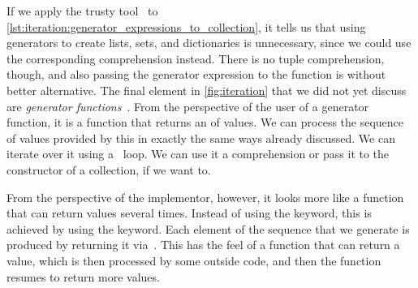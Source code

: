 If we apply the trusty tool \ruff\ to \cref{lst:iteration:generator_expressions_to_collection}, it tells us that using generators to create lists, sets, and dictionaries is unnecessary, since we could use the corresponding comprehension instead.
There is no tuple comprehension, though, and also passing the generator expression to the  function is without better alternative.%
%
%
%
\FloatBarrier%
\endhsection%
%
%
%
%
%
%
%
%
%
The final element in \cref{fig:iteration} that we did not yet discuss are \emph{generator functions}~\cite{PEP255}.
From the perspective of the user of a generator function, it is a function that returns an  of values.
We can process the sequence of values provided by this  in exactly the same ways already discussed.
We can iterate over it using a ~loop.
We can use it a comprehension or pass it to the constructor of a collection, if we want to.

From the perspective of the implementor, however, it looks more like a function that can return values several times.
Instead of using the  keyword, this is achieved by using the  keyword.
Each element of the sequence that we generate is produced by returning it via~.
This has the feel of a function that can return a value, which is then processed by some outside code, and then the function resumes to return more values.

